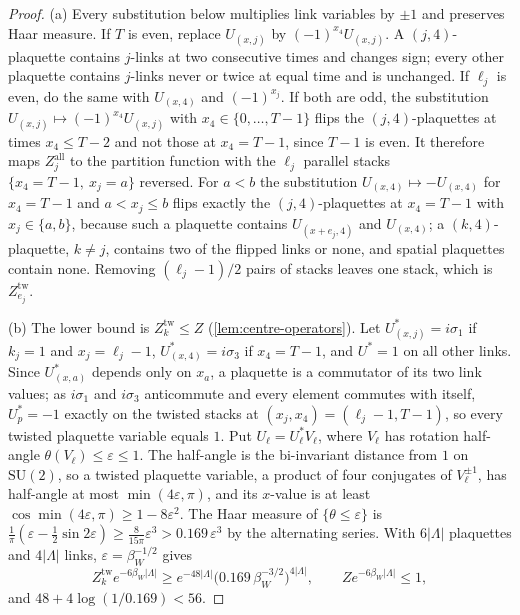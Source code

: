 \documentclass[11pt,a4paper]{amsart}
\theoremstyle{definition}
\theoremstyle{remark}
\numberwithin{equation}{section}
\newcommand{\abs}[1]{\lvert #1\rvert}      %
\newcommand{\SU}{\mathrm{SU}}              %
\newcommand{\betaW}{\beta_{W}}             %
\begin{document}
\begin{proof}
(a) Every substitution below multiplies link variables by $\pm1$ and preserves Haar measure. If $T$ is even, replace $U_{(x,j)}$ by $(-1)^{x_4}U_{(x,j)}$. A $(j,4)$-plaquette contains $j$-links at two consecutive times and changes sign; every other plaquette contains $j$-links never or twice at equal time and is unchanged. If $\ell_j$ is even, do the same with $U_{(x,4)}$ and $(-1)^{x_j}$. If both are odd, the substitution $U_{(x,j)}\mapsto(-1)^{x_4}U_{(x,j)}$ with $x_4\in\{0,\dots,T-1\}$ flips the $(j,4)$-plaquettes at times $x_4\le T-2$ and not those at $x_4=T-1$, since $T-1$ is even. It therefore maps $Z^{\mathrm{all}}_j$ to the partition function with the $\ell_j$ parallel stacks $\{x_4=T-1,\ x_j=a\}$ reversed. For $a<b$ the substitution $U_{(x,4)}\mapsto-U_{(x,4)}$ for $x_4=T-1$ and $a<x_j\le b$ flips exactly the $(j,4)$-plaquettes at $x_4=T-1$ with $x_j\in\{a,b\}$, because such a plaquette contains $U_{(x+e_j,4)}$ and $U_{(x,4)}$; a $(k,4)$-plaquette, $k\ne j$, contains two of the flipped links or none, and spatial plaquettes contain none. Removing $(\ell_j-1)/2$ pairs of stacks leaves one stack, which is $Z^{\mathrm{tw}}_{e_j}$.

(b) The lower bound is $Z^{\mathrm{tw}}_k\le Z$ (\cref{lem:centre-operators}). Let $U^*_{(x,j)}=i\sigma_1$ if $k_j=1$ and $x_j=\ell_j-1$, $U^*_{(x,4)}=i\sigma_3$ if $x_4=T-1$, and $U^*=1$ on all other links. Since $U^*_{(x,a)}$ depends only on $x_a$, a plaquette is a commutator of its two link values; as $i\sigma_1$ and $i\sigma_3$ anticommute and every element commutes with itself, $U^*_p=-1$ exactly on the twisted stacks at $(x_j,x_4)=(\ell_j-1,T-1)$, so every twisted plaquette variable equals $1$. Put $U_\ell=U^*_\ell V_\ell$, where $V_\ell$ has rotation half-angle $\theta(V_\ell)\le\varepsilon\le1$. The half-angle is the bi-invariant distance from $1$ on $\SU(2)$, so a twisted plaquette variable, a product of four conjugates of $V_\ell^{\pm1}$, has half-angle at most $\min(4\varepsilon,\pi)$, and its $x$-value is at least $\cos\min(4\varepsilon,\pi)\ge1-8\varepsilon^2$. The Haar measure of $\{\theta\le\varepsilon\}$ is $\frac1\pi(\varepsilon-\frac12\sin2\varepsilon)\ge\frac8{15\pi}\varepsilon^3>0.169\,\varepsilon^3$ by the alternating series. With $6\abs{\Lambda}$ plaquettes and $4\abs\Lambda$ links, $\varepsilon=\betaW^{-1/2}$ gives
\[
Z^{\mathrm{tw}}_ke^{-6\betaW\abs\Lambda}\ge e^{-48\abs\Lambda}\bigl(0.169\,\betaW^{-3/2}\bigr)^{4\abs\Lambda},\qquad Ze^{-6\betaW\abs\Lambda}\le1,
\]
and $48+4\log(1/0.169)<56$.
\end{proof}
\end{document}
